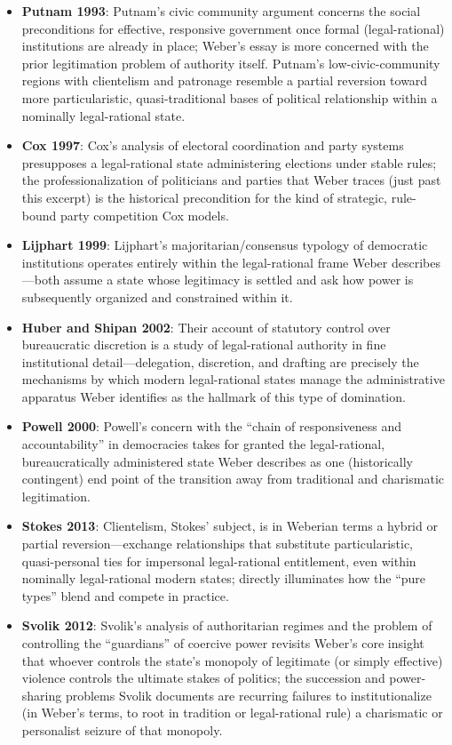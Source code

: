 \documentclass[12pt]{article}
\begin{document}
\begin{itemize}[leftmargin=*, itemsep=4pt]
    \item \textbf{Putnam 1993}: Putnam's civic community argument concerns the social preconditions for effective, responsive government once formal (legal-rational) institutions are already in place; Weber's essay is more concerned with the prior legitimation problem of authority itself. Putnam's low-civic-community regions with clientelism and patronage resemble a partial reversion toward more particularistic, quasi-traditional bases of political relationship within a nominally legal-rational state.
    \item \textbf{Cox 1997}: Cox's analysis of electoral coordination and party systems presupposes a legal-rational state administering elections under stable rules; the professionalization of politicians and parties that Weber traces (just past this excerpt) is the historical precondition for the kind of strategic, rule-bound party competition Cox models.
    \item \textbf{Lijphart 1999}: Lijphart's majoritarian/consensus typology of democratic institutions operates entirely within the legal-rational frame Weber describes---both assume a state whose legitimacy is settled and ask how power is subsequently organized and constrained within it.
    \item \textbf{Huber and Shipan 2002}: Their account of statutory control over bureaucratic discretion is a study of legal-rational authority in fine institutional detail---delegation, discretion, and drafting are precisely the mechanisms by which modern legal-rational states manage the administrative apparatus Weber identifies as the hallmark of this type of domination.
    \item \textbf{Powell 2000}: Powell's concern with the ``chain of responsiveness and accountability'' in democracies takes for granted the legal-rational, bureaucratically administered state Weber describes as one (historically contingent) end point of the transition away from traditional and charismatic legitimation.
    \item \textbf{Stokes 2013}: Clientelism, Stokes' subject, is in Weberian terms a hybrid or partial reversion---exchange relationships that substitute particularistic, quasi-personal ties for impersonal legal-rational entitlement, even within nominally legal-rational modern states; directly illuminates how the ``pure types'' blend and compete in practice.
    \item \textbf{Svolik 2012}: Svolik's analysis of authoritarian regimes and the problem of controlling the ``guardians'' of coercive power revisits Weber's core insight that whoever controls the state's monopoly of legitimate (or simply effective) violence controls the ultimate stakes of politics; the succession and power-sharing problems Svolik documents are recurring failures to institutionalize (in Weber's terms, to root in tradition or legal-rational rule) a charismatic or personalist seizure of that monopoly.

\end{itemize}
\end{document}
